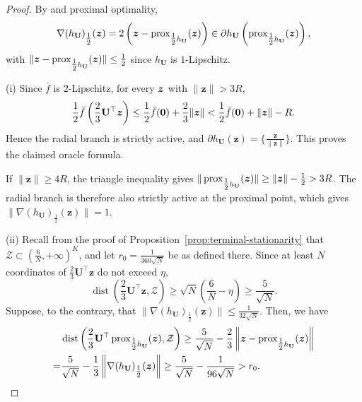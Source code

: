 \begin{proof}
By \cite[Lemma~2.2]{DavisDrusvyatskiy2019}
and proximal optimality,
\begin{equation}
\label{eq:prox}
 \nabla(h_{\mathbf U})_{\tfrac12}(\bm z)
 =2\left(
 \bm z-\operatorname{prox}_{\tfrac12 h_{\mathbf U}}(\bm z)
 \right)
 \in\partial h_{\mathbf U}\left(
 \operatorname{prox}_{\tfrac12 h_{\mathbf U}}(\bm z)
 \right),
\end{equation}
with $\|\bm z-\operatorname{prox}_{\tfrac12 h_{\mathbf U}}(\bm z)\|
\le\tfrac12$ since $h_{\mathbf U}$ is $1$-Lipschitz.

\textrm{(i)}
Since $\bar f$ is $2$-Lipschitz, for every $\bm{z}$ with
$\|\bm z\|>3R$,
\[
 \frac12\bar f\left(\frac23\mathbf U^\top\bm z\right)
 \le\frac12\bar f({\mathbf 0})+\frac23\|\bm z\|
 <\frac12\bar f({\mathbf 0})+\|\bm z\|-R.
\]
Hence the radial branch is strictly active, and
$\partial h_{\mathbf U}(\bm z)
=\{\tfrac{\bm z}{\|\bm z\|}\}$.
This proves the claimed oracle formula.

If $\|\bm z\|\ge4R$, the triangle inequality gives
$\|\operatorname{prox}_{\tfrac12 h_{\mathbf U}}(\bm z)\|
\ge\|\bm z\|-\tfrac12>3R$.
The radial branch is therefore also strictly active
at the proximal point, which gives 
$\|\nabla(h_{\mathbf U})_{\tfrac12}(\bm z)\|=1$.

\textrm{(ii)}
Recall from the proof of
Proposition~\ref{prop:terminal-stationarity} that
$\mathcal Z\subset(\tfrac6N,+\infty)^K$,
and let $r_0=\tfrac1{360\sqrt N}$ be as defined there.
Since at least $N$ coordinates of
$\tfrac23\mathbf U^\top\bm z$ do not exceed $\eta$,
\[
 \operatorname{dist}
 \left(\frac23\mathbf U^\top\bm z,\mathcal Z\right)
 \ge\sqrt N\left(\frac6N-\eta\right)
 \ge\frac5{\sqrt N}.
\]
Suppose, to the contrary, that
$\|\nabla(h_{\mathbf U})_{\tfrac12}(\bm z)\|
\le\tfrac1{32\sqrt N}$.
Then, we have 
\[
\begin{aligned}
 &\operatorname{dist}\left(
 \frac23\mathbf U^\top
 \operatorname{prox}_{\tfrac12 h_{\mathbf U}}(\bm z),\mathcal Z
 \right)\ge
 \frac5{\sqrt N}
 -\frac23
 \left\|\bm z-\operatorname{prox}_{\tfrac12 h_{\mathbf U}}(\bm z)\right\|\\
 = &
 \frac5{\sqrt N}
 -\frac13
 \left\|\nabla(h_{\mathbf U})_{\tfrac12}(\bm z)\right\|\ge
 \frac5{\sqrt N}-\frac1{96\sqrt N}>r_0.
\end{aligned}
\]


\end{proof}
